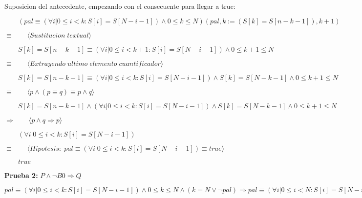 \documentclass{article}
\begin{document}
\vspace{1em}

Suposicion del antecedente, empezando con el consecuente para llegar a true: \par
$\qquad (pal \equiv (\forall i | 0 \leq i < k : S[i]=S[N-i-1]) \land 0 \leq k \leq N )(pal, k := (S[k]=S[n-k-1]), k+1)$ \par

$\equiv  \qquad \langle Sustitucion \; textual \rangle$ \par

$\qquad S[k]=S[n-k-1] \equiv (\forall i | 0 \leq i < k+1 : S[i]=S[N-i-1]) \land 0 \leq k+1 \leq N$ \par

$\equiv  \qquad \langle Extrayendo \; ultimo \; elemento \; cuantificador \rangle$ \par

$\qquad S[k]=S[n-k-1] \equiv (\forall i | 0 \leq i < k : S[i]=S[N-i-1]) \land S[k]=S[N-k-1] \land 0 \leq k+1 \leq N$ \par 

$\equiv  \qquad \langle p \land (p \equiv q) \equiv p \land q  \rangle$ \par 

$\qquad S[k]=S[n-k-1] \land (\forall i | 0 \leq i < k : S[i]=S[N-i-1]) \land S[k]=S[N-k-1] \land 0 \leq k+1 \leq N$ \par 

$\Rightarrow  \qquad \langle p \land q \Rightarrow p  \rangle$ \par 

$\qquad (\forall i | 0 \leq i < k : S[i]=S[N-i-1])$ \par 

$\equiv  \qquad \langle Hipotesis: \; pal \equiv (\forall i | 0 \leq i < k : S[i]=S[N-i-1]) \equiv true  \rangle$ \par 

$\qquad true$ \par 

\newpage

\textbf{Prueba 2:} $P \land \neg B0 \Rightarrow Q$ \par

$pal \equiv (\forall i | 0 \leq i < k : S[i]=S[N-i-1]) \land 0 \leq k \leq N \land (k=N \lor \neg pal) \Rightarrow pal \equiv (\forall i | 0 \leq i < N : S[i]=S[N-i-1])$


\vspace{1em}
\end{document}

